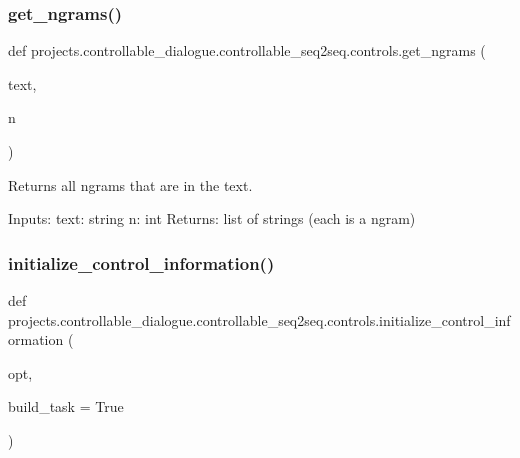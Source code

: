 \subsubsection{\texorpdfstring{get\+\_\+ngrams()}{get\_ngrams()}}
{\footnotesize\ttfamily def projects.\+controllable\+\_\+dialogue.\+controllable\+\_\+seq2seq.\+controls.\+get\+\_\+ngrams (\begin{DoxyParamCaption}\item[{}]{text,  }\item[{}]{n }\end{DoxyParamCaption})}

\begin{DoxyVerb}Returns all ngrams that are in the text.

Inputs:
    text: string
    n: int
Returns:
    list of strings (each is a ngram)
\end{DoxyVerb}
 \mbox{\label{namespaceprojects_1_1controllable__dialogue_1_1controllable__seq2seq_1_1controls_aafbe257df1791349439cc63c99de8b5e}} 
\subsubsection{\texorpdfstring{initialize\+\_\+control\+\_\+information()}{initialize\_control\_information()}}
{\footnotesize\ttfamily def projects.\+controllable\+\_\+dialogue.\+controllable\+\_\+seq2seq.\+controls.\+initialize\+\_\+control\+\_\+information (\begin{DoxyParamCaption}\item[{}]{opt,  }\item[{}]{build\+\_\+task = {\ttfamily True} }\end{DoxyParamCaption})}


